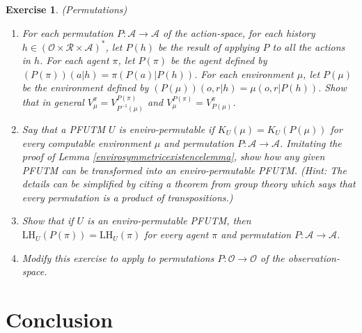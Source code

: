 \documentclass{article}
\newtheorem{exercise}[theorem]{Exercise}
\def\LH{\textrm{LH}}
\def\SYM{S}
\begin{document}
\begin{exercise} (Permutations)
    \begin{enumerate}
        \item
        For each permutation $P:\mathcal A\to\mathcal A$ of the action-space,
        for each history $h\in (\mathcal O\times\mathcal R\times\mathcal A)^*$,
        let $P(h)$ be the result of applying $P$ to all the actions in $h$.
        For each agent $\pi$, let $P(\pi)$ be the agent defined by
        $(P(\pi))(a|h)=\pi(P(a)|P(h))$. For each environment $\mu$, let
        $P(\mu)$ be the environment defined by
        $(P(\mu))(o,r|h)=\mu(o,r|P(h))$. Show that in general
        $V^\pi_\mu = V^{P(\pi)}_{P^{-1}(\mu)}$
        and
        $V^{P(\pi)}_\mu = V^\pi_{P(\mu)}$.
        \item
        Say that a PFUTM $U$ is \emph{enviro-permutable} if
        $K_U(\mu)=K_U(P(\mu))$ for every computable environment $\mu$
        and permutation $P:\mathcal A\to\mathcal A$. Imitating the proof of
        Lemma \ref{envirosymmetricexistencelemma}, show how any given
        PFUTM can be transformed into an enviro-permutable PFUTM.
        (Hint: The details can be simplified by citing a theorem from group
        theory which says that every permutation is a product of transpositions.)
        \item
        Show that if $U$ is an enviro-permutable PFUTM, then $\LH_U(P(\pi))=\LH_U(\pi)$
        for every agent $\pi$ and permutation $P:\mathcal A\to\mathcal A$.
        \item
        Modify this exercise to apply to permutations $P:\mathcal O\to\mathcal O$
        of the observation-space.
    \end{enumerate}
\end{exercise}



\section{Conclusion}
\label{conclusionsecn}
\end{document}
